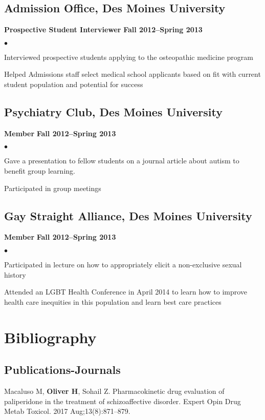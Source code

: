 \documentclass[11pt,letterpaper]{article}
\renewenvironment{itemize}{
  \begin{list}{}{
      \setlength{\leftmargin}{1.5em}
      \setlength{\itemsep}{0.25em}
      \setlength{\parskip}{0pt}
      \setlength{\parsep}{0.25em}
    }
  }{
  \end{list}
}
\newenvironment{bitemize}{
  \begin{list}{\(\bullet \)}{
      \setlength{\leftmargin}{1.5em}
      \setlength{\itemsep}{0.25em}
      \setlength{\parskip}{0pt}
      \setlength{\parsep}{0.25em}
    }
  }{
  \end{list}
}
\newcommand{\yearrange}[1]{\hfill \textbf{#1} \par}
\begin{document}
\subsection*{Admission Office, Des Moines University}
\begin{itemize}
\item \textbf{Prospective Student Interviewer} \yearrange{Fall 2012--Spring 2013}
  \begin{bitemize}
  \item Interviewed prospective students applying to the osteopathic
    medicine program
   \item Helped Admissions staff select medical school applicants based on fit with current student population and potential for success
  \end{bitemize}
\end{itemize}

\subsection*{Psychiatry Club, Des Moines University}
\begin{itemize}
\item \textbf{Member} \yearrange{Fall 2012--Spring 2013}
  \begin{bitemize}
  \item Gave a presentation to fellow students on a journal article about autism to benefit group learning.
  \item Participated in group meetings
   \end{bitemize}
\end{itemize}

\subsection*{Gay Straight Alliance, Des Moines University}
\begin{itemize}
\item \textbf{Member} \yearrange{Fall 2012--Spring 2013}
  \begin{bitemize} 
 \item Participated in lecture on how to appropriately elicit a non-exclusive sexual history
 \item Attended an LGBT Health Conference in April 2014 to learn how to improve health care 
  inequities in this population and learn best care practices
  \end{bitemize}
\end{itemize}


\section*{Bibliography}

\subsection*{Publications-Journals}

Macaluso M, \textbf{Oliver H}, Sohail Z. Pharmacokinetic drug evaluation of paliperidone in the treatment 
  of schizoaffective disorder. Expert Opin Drug Metab Toxicol. 2017 Aug;13(8):871--879.
\end{document}
